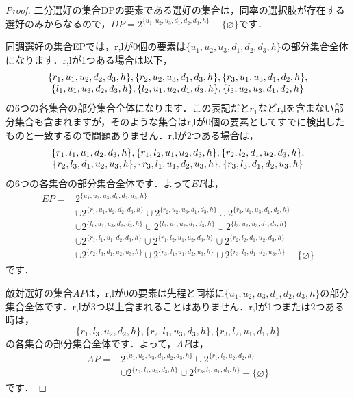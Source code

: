 \begin{proof}
二分選好の集合DPの要素である選好の集合は，同率の選択肢が存在する選好のみからなるので，$DP = 2^{\{u_1,u_2,u_3,d_1,d_2,d_3,h\}} - \{\varnothing\}$です．

同調選好の集合EPでは，r,lが0個の要素は$\{u_1,u_2,u_3,d_1,d_2,d_3,h\}$の部分集合全体になります．r,lが1つある場合は以下，
\begin{equation*}
    \begin{array}[h]{c}
        \{r_1,u_1,u_2,d_2,d_3,h\},
        \{r_2,u_2,u_3,d_1,d_3,h\},
        \{r_3,u_1,u_3,d_1,d_2,h\},\\
        \{l_1,u_1,u_3,d_2,d_3,h\},
        \{l_2,u_1,u_2,d_1,d_3,h\},
        \{l_3,u_2,u_3,d_1,d_2,h\}
    \end{array}
\end{equation*}
の6つの各集合の部分集合全体になります．この表記だと$r_1$などr,lを含まない部分集合も含まれますが，そのような集合はr,lが0個の要素としてすでに検出したものと一致するので問題ありません．r,lが2つある場合は，
\begin{equation*}
    \begin{array}[h]{c}
        \{r_1,l_1,u_1,d_2,d_3,h\},
        \{r_1,l_2,u_1,u_2,d_3,h\},
        \{r_2,l_2,d_1,u_2,d_3,h\},\\
        \{r_2,l_3,d_1,u_2,u_3,h\},
        \{r_3,l_1,u_1,d_2,u_3,h\},
        \{r_3,l_3,d_1,d_2,u_3,h\}
    \end{array}
\end{equation*}
の6つの各集合の部分集合全体です．よって$EP$は，
\begin{align*}
EP = & 2^{\{u_1,u_2,u_3,d_1,d_2,d_3,h\}}\\
     & \cup 2^{\{r_1,u_1,u_2,d_2,d_3,h\}}
       \cup 2^{\{r_2,u_2,u_3,d_1,d_3,h\}}
       \cup 2^{\{r_3,u_1,u_3,d_1,d_2,h\}}\\
     & \cup 2^{\{l_1,u_1,u_3,d_2,d_3,h\}}
       \cup 2^{\{l_2,u_1,u_2,d_1,d_3,h\}}
       \cup 2^{\{l_3,u_2,u_3,d_1,d_2,h\}}\\
     & \cup 2^{\{r_1,l_1,u_1,d_2,d_3,h\}}
       \cup 2^{\{r_1,l_2,u_1,u_2,d_3,h\}}
       \cup 2^{\{r_2,l_2,d_1,u_2,d_3,h\}}\\
     & \cup 2^{\{r_2,l_3,d_1,u_2,u_3,h\}}
       \cup 2^{\{r_3,l_1,u_1,d_2,u_3,h\}}
       \cup 2^{\{r_3,l_3,d_1,d_2,u_3,h\}}
       - \{\varnothing\}
\end{align*}
です．

敵対選好の集合$AP$は，r,lが0の要素は先程と同様に$\{u_1,u_2,u_3,d_1,d_2,d_3,h\}$の部分集合全体です．r,lが3つ以上含まれることはありません．r,lが1つまたは2つある時は，
\begin{equation*}
    \{r_1,l_3,u_2,d_2,h\},\{r_2,l_1,u_3,d_3,h\},\{r_3,l_2,u_1,d_1,h\}
\end{equation*}
の各集合の部分集合全体です．よって，$AP$は，
\begin{align*}
AP = & 2^{\{u_1,u_2,u_3,d_1,d_2,d_3,h\}} 
       \cup 2^{\{r_1,l_3,u_2,d_2,h\}} \\
     & \cup 2^{\{r_2,l_1,u_3,d_3,h\}} 
       \cup 2^{\{r_3,l_2,u_1,d_1,h\}}
       - \{\varnothing\}
\end{align*}
です．


\end{proof}
